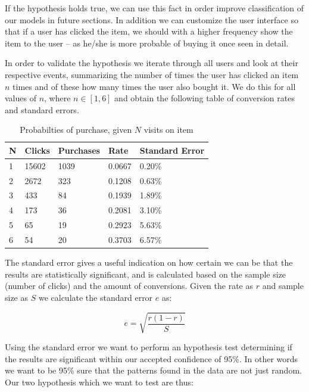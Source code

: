 If the hypothesis holds true, we can use this fact in order improve
classification of our models in future sections. In addition we can customize
the user interface so that if a user has clicked the item, we should with a
higher frequency show the item to the user -- as he/she is more probable of
buying it once seen in detail.

In order to validate the hypothesis we iterate through all users and look at
their respective events, summarizing the number of times the user has clicked
an item $n$ times and of these how many times the user also bought it. We do
this for all values of $n$, where $n \in [1,6]$ and obtain the following table
of conversion rates and standard errors.

\begin{table}[H]
  \centering
  \begin{tabular}{lllll}
    \toprule
    N & Clicks & Purchases & Rate & Standard Error \\
    \midrule
    1 & 15602 & 1039  & 0.0667 & 0.20\% \\
    2 & 2672  & 323   & 0.1208 & 0.63\% \\
    3 & 433   & 84    & 0.1939 & 1.89\% \\
    4 & 173   & 36    & 0.2081 & 3.10\% \\
    5 & 65    & 19    & 0.2923 & 5.63\% \\
    6 & 54    & 20    & 0.3703 & 6.57\% \\
    \bottomrule
  \end{tabular}
  \caption{Probabilties of purchase, given $N$ visits on item}
  \label{tab:prob-purchase}
\end{table}

The standard error gives a useful indication on how certain we can be that the
results are statistically significant, and is calculated based on the sample
size (number of clicks) and the amount of conversions. Given the rate as $r$
and sample size as $S$ we calculate the standard error $e$ as:

\begin{equation}
  e = \sqrt{\frac{r(1 - r)}{S}}
\end{equation}

Using the standard error we want to perform an hypothesis test determining if
the results are significant within our accepted confidence of 95\%. In other
words we want to be 95\% sure that the patterns found in the data are not just
random. Our two hypothesis which we want to test are thus:

